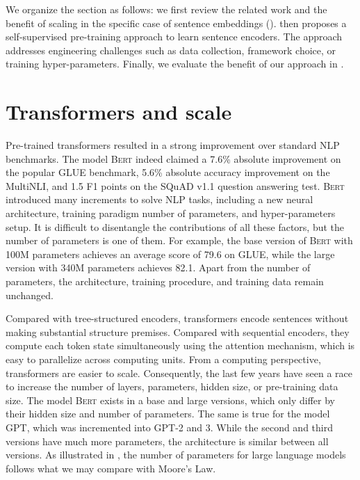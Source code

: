 We organize the section as follows: we first review the related work and the benefit of scaling in the specific case of sentence embeddings ().  then proposes a self-supervised pre-training approach to learn sentence encoders. The approach addresses engineering challenges such as data collection, framework choice, or training hyper-parameters. Finally, we evaluate the benefit of our approach in .

\section{Transformers and scale}

Pre-trained transformers resulted in a strong improvement over standard NLP benchmarks. The model \textsc{Bert} indeed claimed a 7.6\% absolute improvement on the popular GLUE benchmark, 5.6\% absolute accuracy improvement on the MultiNLI, and 1.5 F1 points on the SQuAD v1.1 question answering test. \textsc{Bert} introduced many increments to solve NLP tasks, including a new neural architecture, training paradigm number of parameters, and hyper-parameters setup. It is difficult to disentangle the contributions of all these factors, but the number of parameters is one of them. For example, the base version of \textsc{Bert} with 100M parameters achieves an average score of 79.6 on GLUE, while the large version with 340M parameters achieves 82.1. Apart from the number of parameters, the architecture, training procedure, and training data remain unchanged.

Compared with tree-structured encoders, transformers encode sentences without making substantial structure premises. Compared with sequential encoders, they compute each token state simultaneously using the attention mechanism, which is easy to parallelize across computing units. From a computing perspective, transformers are easier to scale. Consequently, the last few years have seen a race to increase the number of layers, parameters, hidden size, or pre-training data size. The model \textsc{Bert} exists in a base and large versions, which only differ by their hidden size and number of parameters. The same is true for the model GPT, which was incremented into GPT-2 and 3. While the second and third versions have much more parameters, the architecture is similar between all versions. As illustrated in , the number of parameters for large language models follows what we may compare with Moore's Law.

